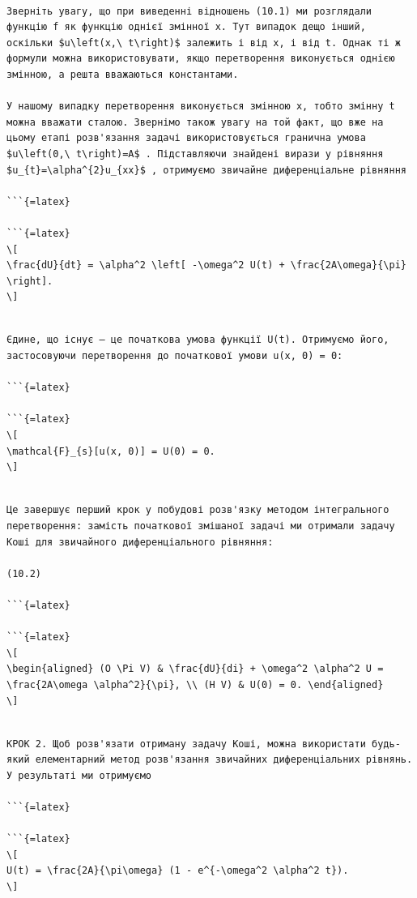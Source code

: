 \documentclass[
]{article}
\begin{document}
\begin{verbatim}

Зверніть увагу, що при виведенні відношень (10.1) ми розглядали функцію f як функцію однієї змінної x. Тут випадок дещо інший, оскільки $u\left(x,\ t\right)$ залежить і від x, і від t. Однак ті ж формули можна використовувати, якщо перетворення виконується однією змінною, а решта вважаються константами.

У нашому випадку перетворення виконується змінною x, тобто змінну t можна вважати сталою. Звернімо також увагу на той факт, що вже на цьому етапі розв'язання задачі використовується гранична умова $u\left(0,\ t\right)=A$ . Підставляючи знайдені вирази у рівняння $u_{t}=\alpha^{2}u_{xx}$ , отримуємо звичайне диференціальне рівняння

```{=latex}

```{=latex}
\[
\frac{dU}{dt} = \alpha^2 \left[ -\omega^2 U(t) + \frac{2A\omega}{\pi} \right].
\]
\end{verbatim}

\begin{verbatim}

Єдине, що існує — це початкова умова функції U(t). Отримуємо його, застосовуючи перетворення до початкової умови u(x, 0) = 0:

```{=latex}

```{=latex}
\[
\mathcal{F}_{s}[u(x, 0)] = U(0) = 0.
\]
\end{verbatim}

\begin{verbatim}

Це завершує перший крок у побудові розв'язку методом інтегрального перетворення: замість початкової змішаної задачі ми отримали задачу Коші для звичайного диференціального рівняння:

(10.2)

```{=latex}

```{=latex}
\[
\begin{aligned} (O \Pi V) & \frac{dU}{di} + \omega^2 \alpha^2 U = \frac{2A\omega \alpha^2}{\pi}, \\ (H V) & U(0) = 0. \end{aligned}
\]
\end{verbatim}

\begin{verbatim}

КРОК 2. Щоб розв'язати отриману задачу Коші, можна використати будь-який елементарний метод розв'язання звичайних диференціальних рівнянь. У результаті ми отримуємо

```{=latex}

```{=latex}
\[
U(t) = \frac{2A}{\pi\omega} (1 - e^{-\omega^2 \alpha^2 t}).
\]
\end{verbatim}
\end{document}
